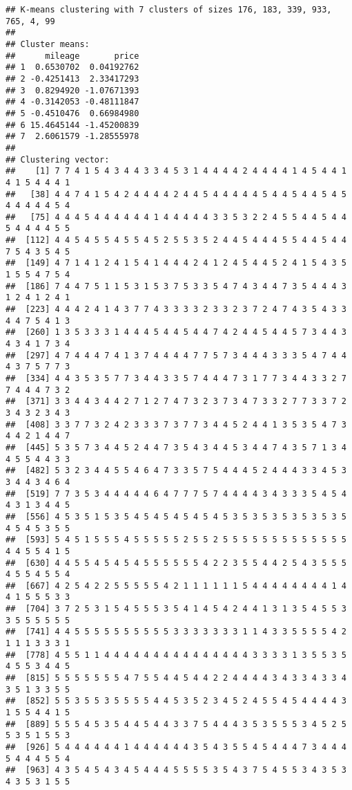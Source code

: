\documentclass[
]{article}
\begin{document}
\begin{verbatim}
## K-means clustering with 7 clusters of sizes 176, 183, 339, 933, 765, 4, 99
## 
## Cluster means:
##      mileage       price
## 1  0.6530702  0.04192762
## 2 -0.4251413  2.33417293
## 3  0.8294920 -1.07671393
## 4 -0.3142053 -0.48111847
## 5 -0.4510476  0.66984980
## 6 15.4645144 -1.45200839
## 7  2.6061579 -1.28555978
## 
## Clustering vector:
##    [1] 7 7 4 1 5 4 3 4 4 3 3 4 5 3 1 4 4 4 4 2 4 4 4 4 1 4 5 4 4 1 4 1 5 4 4 4 1
##   [38] 4 4 7 4 1 5 4 2 4 4 4 4 2 4 4 5 4 4 4 4 4 5 4 4 5 4 4 5 4 5 4 4 4 4 4 5 4
##   [75] 4 4 4 5 4 4 4 4 4 4 1 4 4 4 4 4 3 3 5 3 2 2 4 5 5 4 4 5 4 4 5 4 4 4 4 5 5
##  [112] 4 4 5 4 5 5 4 5 5 4 5 2 5 5 3 5 2 4 4 5 4 4 4 5 5 4 4 5 4 4 7 5 4 3 5 4 5
##  [149] 4 7 1 4 1 2 4 1 5 4 1 4 4 4 2 4 1 2 4 5 4 4 5 2 4 1 5 4 3 5 1 5 5 4 7 5 4
##  [186] 7 4 4 7 5 1 1 5 3 1 5 3 7 5 3 3 5 4 7 4 3 4 4 7 3 5 4 4 4 3 1 2 4 1 2 4 1
##  [223] 4 4 4 2 4 1 4 3 7 7 4 3 3 3 3 2 3 3 2 3 7 2 4 7 4 3 5 4 3 3 4 4 7 5 4 1 3
##  [260] 1 3 5 3 3 3 1 4 4 4 5 4 4 5 4 4 7 4 2 4 4 5 4 4 5 7 3 4 4 3 4 3 4 1 7 3 4
##  [297] 4 7 4 4 4 7 4 1 3 7 4 4 4 4 7 7 5 7 3 4 4 4 3 3 3 5 4 7 4 4 4 3 7 5 7 7 3
##  [334] 4 4 3 5 3 5 7 7 3 4 4 3 3 5 7 4 4 4 7 3 1 7 7 3 4 4 3 3 2 7 7 4 4 4 7 3 2
##  [371] 3 3 4 4 3 4 4 2 7 1 2 7 4 7 3 2 3 7 3 4 7 3 3 2 7 7 3 3 7 2 3 4 3 2 3 4 3
##  [408] 3 3 7 7 3 2 4 2 3 3 3 7 3 7 7 3 4 4 5 2 4 4 1 3 5 3 5 4 7 3 4 4 2 1 4 4 7
##  [445] 5 3 5 7 3 4 4 5 2 4 4 7 3 5 4 3 4 4 5 3 4 4 7 4 3 5 7 1 3 4 4 5 5 4 4 3 3
##  [482] 5 3 2 3 4 4 5 5 4 6 4 7 3 3 5 7 5 4 4 4 5 2 4 4 4 3 3 4 5 3 3 4 4 3 4 6 4
##  [519] 7 7 3 5 3 4 4 4 4 4 6 4 7 7 7 5 7 4 4 4 4 3 4 3 3 3 5 4 5 4 4 3 1 3 4 4 5
##  [556] 4 5 3 5 1 5 3 5 4 5 4 5 4 5 4 5 4 5 3 5 3 5 3 5 3 5 3 5 3 5 4 5 4 5 3 5 5
##  [593] 5 4 5 1 5 5 5 4 5 5 5 5 5 2 5 5 2 5 5 5 5 5 5 5 5 5 5 5 5 5 4 4 5 5 4 1 5
##  [630] 4 4 5 5 4 5 4 5 4 5 5 5 5 5 5 4 2 2 3 5 5 4 4 2 5 4 3 5 5 5 4 5 5 4 5 5 4
##  [667] 4 2 5 4 2 2 5 5 5 5 5 4 2 1 1 1 1 1 1 5 4 4 4 4 4 4 4 4 1 4 4 1 5 5 5 3 3
##  [704] 3 7 2 5 3 1 5 4 5 5 5 3 5 4 1 4 5 4 2 4 4 1 3 1 3 5 4 5 5 3 3 5 5 5 5 5 5
##  [741] 4 4 5 5 5 5 5 5 5 5 5 5 3 3 3 3 3 3 3 1 1 4 3 3 5 5 5 5 4 2 1 1 1 3 3 3 1
##  [778] 4 5 5 1 1 4 4 4 4 4 4 4 4 4 4 4 4 4 4 4 3 3 3 3 1 3 5 5 3 5 4 5 5 3 4 4 5
##  [815] 5 5 5 5 5 5 5 4 7 5 5 4 4 5 4 4 2 2 4 4 4 4 3 4 3 3 4 3 3 4 3 5 1 3 3 5 5
##  [852] 5 5 3 5 5 3 5 5 5 5 4 4 5 3 5 2 3 4 5 2 4 5 5 4 5 4 4 4 4 3 1 5 5 4 4 1 5
##  [889] 5 5 5 4 5 3 5 4 4 5 4 4 3 3 7 5 4 4 4 3 5 3 5 5 5 3 4 5 2 5 5 3 5 1 5 5 3
##  [926] 5 4 4 4 4 4 4 1 4 4 4 4 4 4 3 5 4 3 5 5 4 5 4 4 4 7 3 4 4 4 5 4 4 4 5 5 4
##  [963] 4 3 5 4 5 4 3 4 5 4 4 4 5 5 5 5 3 5 4 3 7 5 4 5 5 3 4 3 5 3 4 3 5 3 1 5 5

\end{verbatim}
\end{document}

